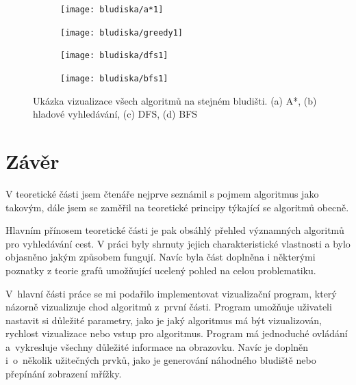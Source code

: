 \documentclass[12pt]{report}			%
\begin{document}
\begin{figure}
  			\centering
  			\begin{subfigure}[b]{0.48\textwidth}
  			\centering 
  			\texttt{[image: bludiska/a*1]}
  			\caption{}
  			\end{subfigure}
  			\hfill
  			\begin{subfigure}[b]{0.48\textwidth}
    		\centering
\texttt{[image: bludiska/greedy1]}
    		\caption{}
  			\end{subfigure}
  			\begin{subfigure}[b]{0.48\textwidth}
    		\centering
\texttt{[image: bludiska/dfs1]}\caption{}
\end{subfigure}
\hfill
  			\begin{subfigure}[b]{0.48\textwidth}
    		\centering
\texttt{[image: bludiska/bfs1]}
    		\caption{}
  			\end{subfigure}


  \caption{Ukázka vizualizace všech algoritmů na stejném bludišti. (a) A*, (b) hladové vyhledávání, (c) DFS, (d) BFS}
  \label{ukazka_vsechny}
  
\end{figure}			



  			
			


	\chapter*{Závěr}
	
	V teoretické části jsem čtenáře nejprve seznámil s pojmem algoritmus jako takovým, dále jsem se zaměřil na teoretické principy týkající se algoritmů obecně.  
	
	Hlavním přínosem teoretické části je pak obsáhlý přehled významných algoritmů pro vyhledávání cest. V práci byly shrnuty jejich charakteristické vlastnosti a bylo objasněno jakým způsobem fungují. Navíc byla část doplněna i některými poznatky z teorie grafů umožňující ucelený pohled na celou problematiku.
	
		V~hlavní části práce se mi podařilo implementovat vizualizační program, který názorně vizualizuje chod algoritmů z~první části. Program umožňuje uživateli nastavit si důležité parametry, jako je jaký algoritmus má být vizualizován, rychlost vizualizace nebo vstup pro algoritmus. Program má jednoduché ovládání a~vykresluje všechny důležité informace na obrazovku. Navíc je doplněn i~o~několik užitečných prvků, jako je generování náhodného bludiště nebo přepínání zobrazení mřížky.
		
\end{document}
